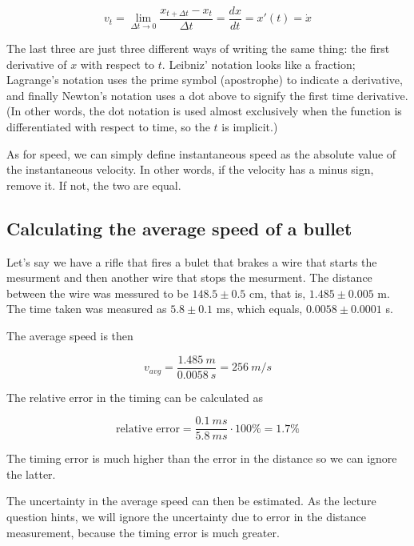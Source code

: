 \begingroup
\large
\begin{equation}
 v_t = \lim_{\Delta t \to 0} \frac{x_{t + \Delta t} - x_t}{\Delta t} = \frac{dx}{dt} = x'(t) = \dot{x}
\end{equation}
\endgroup

The last three are just three different ways of writing the same thing: the first derivative of $x$ with respect to $t$. Leibniz' notation looks like a fraction; Lagrange's notation uses the prime symbol (apostrophe) to indicate a derivative, and finally Newton's notation uses a dot above to signify the first time derivative. (In other words, the dot notation is used almost exclusively when the function is differentiated with respect to time, so the $t$ is implicit.)

As for speed, we can simply define instantaneous speed as the absolute value of the instantaneous velocity. In other words, if the velocity has a minus sign, remove it. If not, the two are equal.


\subsection{Calculating the average speed of a bullet}

Let's say we have a rifle that fires a bulet that brakes a wire that 
starts the mesurment and then another wire that stops the mesurment.
The distance between the wire was messured to be $148.5 \pm 0.5$ cm, that is, $1.485 \pm 0.005$ m.\\
The time taken was measured as $5.8 \pm 0.1$ ms, which equals, $0.0058 \pm 0.0001$ s.

The average speed is then

\begin{equation}
v_{avg} = \frac{\SI{1.485}{m}}{\SI{0.0058}{s}} = \SI{256}{m/s}
\end{equation}

The relative error in the timing can be calculated as 

\begin{equation}
\text{relative error} = \frac{\SI{0.1}{ms}}{\SI{5.8}{ms}} \cdot 100\% = 1.7\% 
\end{equation}

The timing error is much higher than the error in the distance so we can ignore the latter.

The uncertainty in the average speed can then be estimated. As the lecture question hints, we will ignore the uncertainty due to error in the distance measurement, because the timing error is much greater.

